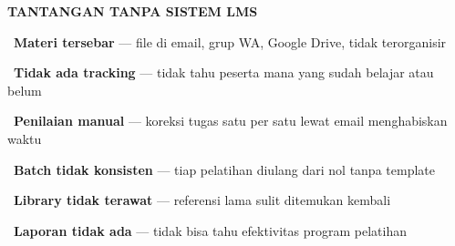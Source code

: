 \documentclass[a4paper]{article}
\begin{document}
\noindent
\begin{minipage}[t]{0.485\textwidth}
    \colorbox{RedLight}{%
        \begin{minipage}{\dimexpr\textwidth-14pt}
            \vspace{5pt}
            {\fontsize{10}{13}\selectfont\bfseries\color{RedText} TANTANGAN TANPA SISTEM LMS}
            \vspace{5pt}
        \end{minipage}}
    \vspace{6pt}

    {\fontsize{9.5}{13}\selectfont\color{TextDark}%
    \textbullet\ \textbf{Materi tersebar} --- file di email, grup WA, Google Drive, tidak terorganisir\par\vspace{4pt}%
    \textbullet\ \textbf{Tidak ada tracking} --- tidak tahu peserta mana yang sudah belajar atau belum\par\vspace{4pt}%
    \textbullet\ \textbf{Penilaian manual} --- koreksi tugas satu per satu lewat email menghabiskan waktu\par\vspace{4pt}%
    \textbullet\ \textbf{Batch tidak konsisten} --- tiap pelatihan diulang dari nol tanpa template\par\vspace{4pt}%
    \textbullet\ \textbf{Library tidak terawat} --- referensi lama sulit ditemukan kembali\par\vspace{4pt}%
    \textbullet\ \textbf{Laporan tidak ada} --- tidak bisa tahu efektivitas program pelatihan}%
\end{minipage}%
\hfill%
\end{document}
